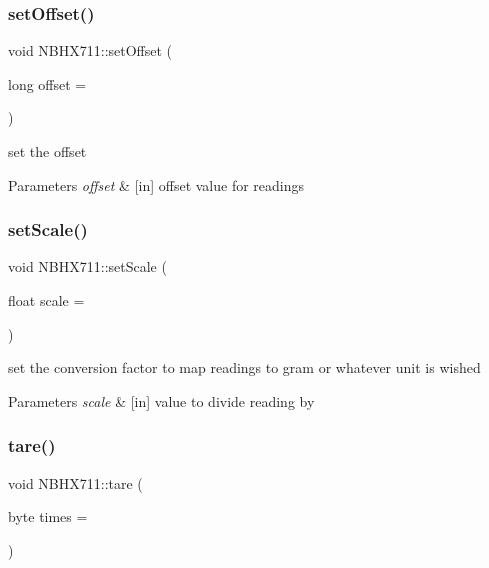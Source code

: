 \subsubsection{\texorpdfstring{set\+Offset()}{setOffset()}}
{\footnotesize\ttfamily void N\+B\+H\+X711\+::set\+Offset (\begin{DoxyParamCaption}\item[{long}]{offset = {} }\end{DoxyParamCaption})}

set the offset 
\begin{DoxyParams}{Parameters}
{\em offset} & \mbox{[}in\mbox{]} offset value for readings \\
\hline
\end{DoxyParams}
\mbox{\label{class_n_b_h_x711_a272ff1fb4222e86f0561ad3d55a6ce28}} 
\subsubsection{\texorpdfstring{set\+Scale()}{setScale()}}
{\footnotesize\ttfamily void N\+B\+H\+X711\+::set\+Scale (\begin{DoxyParamCaption}\item[{float}]{scale = {} }\end{DoxyParamCaption})}

set the conversion factor to map readings to gram or whatever unit is wished 
\begin{DoxyParams}{Parameters}
{\em scale} & \mbox{[}in\mbox{]} value to divide reading by \\
\hline
\end{DoxyParams}
\mbox{\label{class_n_b_h_x711_a130b9daba88bb002cd4a6d4591105c71}} 
\subsubsection{\texorpdfstring{tare()}{tare()}}
{\footnotesize\ttfamily void N\+B\+H\+X711\+::tare (\begin{DoxyParamCaption}\item[{byte}]{times = {} }\end{DoxyParamCaption})}


